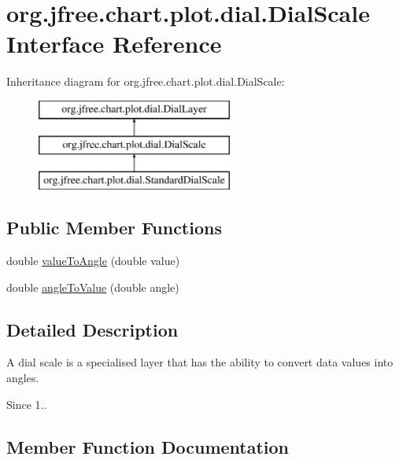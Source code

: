 \hypertarget{interfaceorg_1_1jfree_1_1chart_1_1plot_1_1dial_1_1_dial_scale}{}\section{org.\+jfree.\+chart.\+plot.\+dial.\+Dial\+Scale Interface Reference}
\label{interfaceorg_1_1jfree_1_1chart_1_1plot_1_1dial_1_1_dial_scale}
Inheritance diagram for org.\+jfree.\+chart.\+plot.\+dial.\+Dial\+Scale\+:\begin{figure}[H]
\begin{center}
\leavevmode
\includegraphics[height=3.000000cm]{interfaceorg_1_1jfree_1_1chart_1_1plot_1_1dial_1_1_dial_scale}
\end{center}
\end{figure}
\subsection*{Public Member Functions}
\begin{DoxyCompactItemize}
\item 
double \mbox{\hyperlink{interfaceorg_1_1jfree_1_1chart_1_1plot_1_1dial_1_1_dial_scale_a62e51ecfa46b525c6476d99e69472d9e}{value\+To\+Angle}} (double value)
\item 
double \mbox{\hyperlink{interfaceorg_1_1jfree_1_1chart_1_1plot_1_1dial_1_1_dial_scale_a53cbe3e0ce73e266dab63941474cc343}{angle\+To\+Value}} (double angle)
\end{DoxyCompactItemize}


\subsection{Detailed Description}
A dial scale is a specialised layer that has the ability to convert data values into angles.

\begin{DoxySince}{Since}
1.. 
\end{DoxySince}


\subsection{Member Function Documentation}
\mbox{\label{interfaceorg_1_1jfree_1_1chart_1_1plot_1_1dial_1_1_dial_scale_a53cbe3e0ce73e266dab63941474cc343}} 
